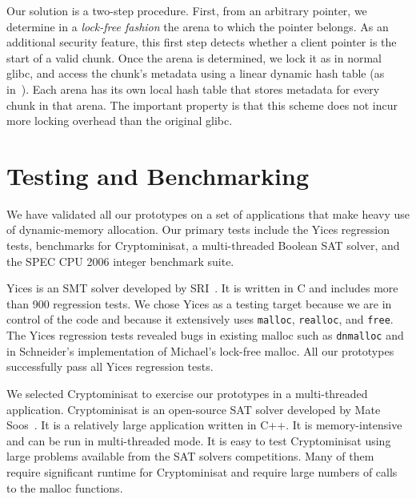 \documentclass[12pt]{cslreport}
\begin{document}
Our solution is a two-step procedure. First, from an arbitrary
pointer, we determine in a \emph{lock-free fashion\/} the arena to
which the pointer belongs. As an additional security feature, this
first step detects whether a client pointer is the start of a valid
chunk.  Once the arena is determined, we lock it as in normal glibc,
and access the chunk's metadata using a linear dynamic hash table (as
in~\cite{Larson:1988:DHT}).  Each arena has its own local hash table
that stores metadata for every chunk in that arena. The important
property is that this scheme does not incur more locking overhead than
the original glibc.





\section{Testing and Benchmarking}

We have validated all our prototypes on a set of applications that
make heavy use of dynamic-memory allocation. Our primary tests include
the Yices regression tests, benchmarks for Cryptominisat, a
multi-threaded Boolean SAT solver, and the SPEC CPU 2006 integer
benchmark suite.  

Yices is an SMT solver developed by
SRI~\cite{Dutertre:cav2014}. It is written in C and includes
more than 900 regression tests. We chose Yices as a testing target
because we are in control of the code and because it extensively uses
\texttt{malloc}, \texttt{realloc}, and \texttt{free}. The Yices
regression tests revealed bugs in existing malloc such as
\texttt{dnmalloc} and in Schneider's implementation of Michael's
lock-free malloc. All our prototypes successfully pass all Yices
regression tests.

We selected Cryptominisat to exercise our prototypes in a
multi-threaded application. Cryptominisat is an open-source SAT solver
developed by Mate Soos~\cite{cryptominisat}. It is a relatively large
application written in C++. It is memory-intensive and can be run in
multi-threaded mode. It is easy to test Cryptominisat using large
problems available from the SAT solvers competitions. Many of them
require significant runtime for Cryptominisat and require large
numbers of calls to the malloc functions.
\end{document}
